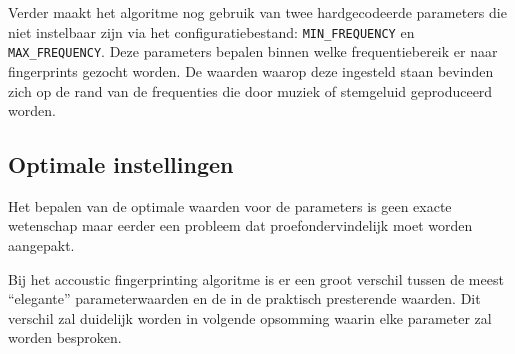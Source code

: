 Verder maakt het algoritme nog gebruik van twee hardgecodeerde parameters die niet instelbaar zijn via het configuratiebestand: \texttt{MIN\_FREQUENCY} en \texttt{MAX\_FREQUENCY}. Deze parameters bepalen binnen welke frequentiebereik er naar fingerprints gezocht worden. De waarden waarop deze ingesteld staan bevinden zich op de rand van de frequenties die door muziek of stemgeluid geproduceerd worden.

\subsection{Optimale instellingen}
\label{optimal-accoustic-fingerprinting}

Het bepalen van de optimale waarden voor de parameters is geen exacte wetenschap maar eerder een probleem dat proefondervindelijk moet worden aangepakt.

Bij het accoustic fingerprinting algoritme is er een groot verschil tussen de meest ``elegante'' parameterwaarden en de in de praktisch presterende waarden. Dit verschil zal duidelijk worden in volgende opsomming waarin elke parameter zal worden besproken.


